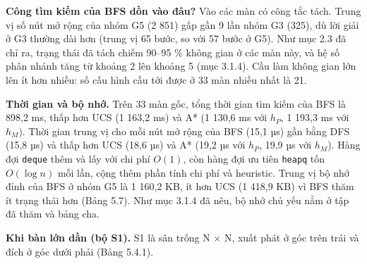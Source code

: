 \textbf{Công tìm kiếm của BFS dồn vào đâu?} Vào các màn có công tắc tách. Trung vị số nút mở rộng của nhóm G5 (2 851) gấp gần 9 lần nhóm G3 (325), dù lời giải ở G3 thường dài hơn (trung vị 65 bước, so với 57 bước ở G5). Như mục 2.3 đã chỉ ra, trạng thái đã tách chiếm 90--95 \% không gian ở các màn này, và hệ số phân nhánh tăng từ khoảng 2 lên khoảng 5 (mục 3.1.4). Cầu làm không gian lớn lên ít hơn nhiều: số cấu hình cầu tới được ở 33 màn nhiều nhất là 21.

\textbf{Thời gian và bộ nhớ.} Trên 33 màn gốc, tổng thời gian tìm kiếm của BFS là 898,2 ms, thấp hơn UCS (1 163,2 ms) và A* (1 130,6 ms với \(h_P\), 1 193,3 ms với \(h_M\)). Thời gian trung vị cho mỗi nút mở rộng của BFS (15,1 µs) gần bằng DFS (15,8 µs) và thấp hơn UCS (18,6 µs) và A* (19,2 µs với \(h_P\), 19,9 µs với \(h_M\)). Hàng đợi \texttt{deque} thêm và lấy với chi phí \(O(1)\), còn hàng đợi ưu tiên \texttt{heapq} tốn \(O(\log n)\) mỗi lần, cộng thêm phần tính chi phí và heuristic. Trung vị bộ nhớ đỉnh của BFS ở nhóm G5 là 1 160,2 KB, ít hơn UCS (1 418,9 KB) vì BFS thăm ít trạng thái hơn (Bảng 5.7). Như mục 3.1.4 đã nêu, bộ nhớ chủ yếu nằm ở tập đã thăm và bảng cha.

\textbf{Khi bàn lớn dần (bộ S1).} S1 là sân trống N × N, xuất phát ở góc trên trái và đích ở góc dưới phải (Bảng 5.4.1).

